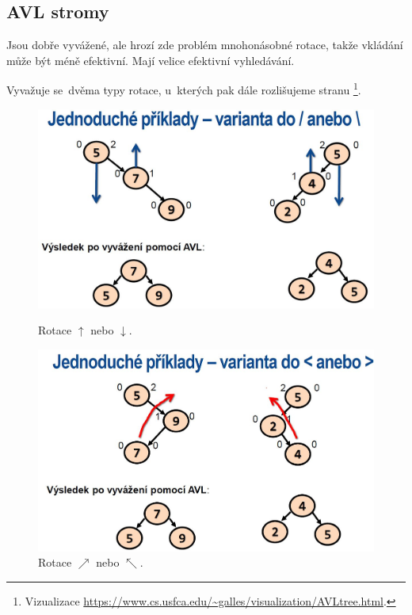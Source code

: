 \subsection{AVL stromy}

Jsou dobře vyvážené, ale hrozí zde problém mnohonásobné rotace, takže vkládání může být méně efektivní. Mají velice efektivní vyhledávání.

Vyvažuje se~dvěma typy rotace, u~kterých pak dále rozlišujeme stranu%
\footnote{Vizualizace \url{https://www.cs.usfca.edu/~galles/visualization/AVLtree.html}.}.

\begin{figure}[ht]
	\begin{minipage}[b]{0.47\textwidth}
		\includegraphics[width=\textwidth]{images/Rotation1Type.JPG}
		\caption{Rotace \( \uparrow \) nebo \( \downarrow \).}
	\end{minipage}
	\hspace*{1em}%
	\begin{minipage}[b]{0.47\textwidth}
		\includegraphics[width=\textwidth]{images/Rotation2Type.JPG}
		\caption{Rotace \( \nearrow \) nebo \( \nwarrow \).}
	\end{minipage}
\end{figure}

